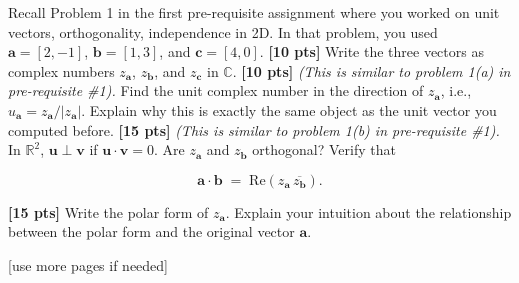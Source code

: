 \documentclass{ee102_pset}
\begin{document}
\newpage
{} Recall Problem 1 in the first pre-requisite assignment where you worked on unit vectors, orthogonality, independence in 2D. In that problem, you used $\mathbf{a}=[2,-1]$, $\mathbf{b}=[1,3]$, and $\mathbf{c}=[4,0]$. 
\problempart \textbf{[10 pts]} Write the three vectors as complex numbers $z_{\mathbf{a}}$, $z_{\mathbf{b}}$, and $z_{\mathbf{c}}$ in $\mathbb{C}$.
\problempart \textbf{[10 pts]} \emph{(This is similar to problem 1(a) in pre-requisite \#1).} Find the unit complex number in the direction of $z_{\mathbf{a}}$, i.e., $u_{\mathbf{a}}=z_{\mathbf{a}}/|z_{\mathbf{a}}|$. Explain why this is exactly the same object as the unit vector you computed before.
\problempart \textbf{[15 pts]} \emph{(This is similar to problem 1(b) in pre-requisite \#1).} In $\mathbb{R}^2$, $\mathbf{u}\perp\mathbf{v}$ if $\mathbf{u}\cdot\mathbf{v}=0$. Are $z_{\mathbf{a}}$ and $z_{\mathbf{b}}$ orthogonal? Verify that 

\[
\mathbf{a}\cdot\mathbf{b} \;=\; \mathrm{Re}\!\left(z_{\mathbf{a}}\,\overline{z_{\mathbf{b}}}\right).
\]


\problempart \textbf{[15 pts]} Write the polar form of $z_{\mathbf{a}}$. Explain your intuition about the relationship between the polar form and the original vector $\mathbf{a}$.

\vspace*{\fill}
\begin{center}
[use more pages if needed]
\end{center}
\end{document}
